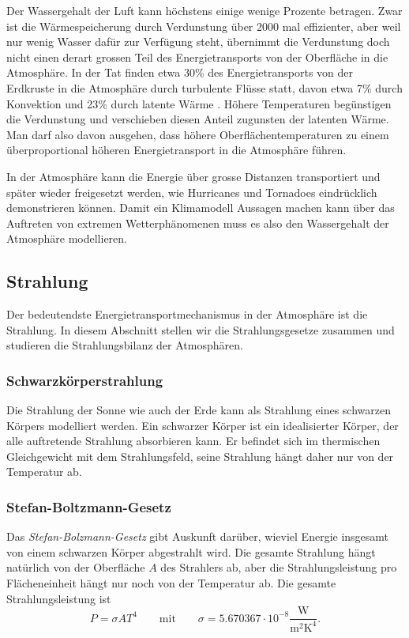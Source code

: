 Der Wassergehalt der Luft kann höchstens einige wenige Prozente betragen.
Zwar ist die Wärmespeicherung durch Verdunstung über 2000 mal effizienter,
aber weil nur wenig Wasser dafür zur Verfügung steht, übernimmt die Verdunstung
doch nicht einen derart grossen Teil des Energietransports von der
Oberfläche in die Atmosphäre.
In der Tat finden etwa 30\% des Energietransports von der Erdkruste
in die Atmosphäre durch turbulente Flüsse statt, davon etwa
7\% durch Konvektion und 23\% durch latente Wärme
\cite[S.~70]{skript:wiefunktioniertdas}.
Höhere Temperaturen begünstigen die Verdunstung und verschieben diesen
Anteil zugunsten der latenten Wärme.
Man darf also davon ausgehen, dass höhere Oberflächentemperaturen
zu einem überproportional höheren Energietransport in die Atmosphäre
führen.

In der Atmosphäre kann die Energie über grosse Distanzen transportiert
und später wieder freigesetzt werden, wie Hurricanes und Tornadoes
eindrücklich demonstrieren können.
Damit ein Klimamodell Aussagen machen kann über das Auftreten von
extremen Wetterphänomenen muss es also den Wassergehalt der
Atmosphäre modellieren.

\subsection{Strahlung}
Der bedeutendste Energietransportmechanismus in der Atmosphäre ist
die Strahlung.
In diesem Abschnitt stellen wir die Strahlungsgesetze zusammen und
studieren die Strahlungsbilanz der Atmosphären.

\subsubsection{Schwarzkörperstrahlung}
%
Die Strahlung der Sonne wie auch der Erde kann als Strahlung eines
schwarzen Körpers modelliert werden.
Ein schwarzer Körper ist ein idealisierter Körper, der alle auftretende
Strahlung absorbieren kann.
Er befindet sich im thermischen Gleichgewicht mit dem Strahlungsfeld,
seine Strahlung hängt daher nur von der Temperatur ab.

\subsubsection{Stefan-Boltzmann-Gesetz}
Das {\em Stefan-Bolzmann-Gesetz} gibt Auskunft darüber, wieviel
Energie insgesamt von einem schwarzen Körper abgestrahlt wird.
Die gesamte Strahlung hängt natürlich von der Oberfläche $A$ des Strahlers ab,
aber die Strahlungsleistung pro Flächeneinheit hängt
nur noch von der
Temperatur ab.
Die gesamte Strahlungsleistung ist
\begin{equation}
P=\sigma AT^4
\qquad \text{mit}\qquad
\sigma=5.670367\cdot10^{-8}\frac{\text{W}}{\text{m}^2\text{K}^4}.
\label{skript:stefon-boltzmann}
\end{equation}

